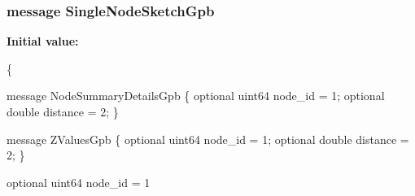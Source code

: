 \subsubsection[{Single\+Node\+Sketch\+Gpb}]{\setlength{\rightskip}{0pt plus 5cm}message Single\+Node\+Sketch\+Gpb}\label{all__distance__sketch_8proto_a439dc8f2c6166ba58d497513ebc92723}
{\bfseries Initial value\+:}
\begin{DoxyCode}
\{
  
  message NodeSummaryDetailsGpb \{
      optional uint64 node\_id = 1;
      optional \textcolor{keywordtype}{double} distance = 2;
  \}

  message ZValuesGpb \{
    optional uint64 node\_id = 1;
    optional \textcolor{keywordtype}{double} distance = 2;
  \}

  optional uint64 node\_id = 1
\end{DoxyCode}
